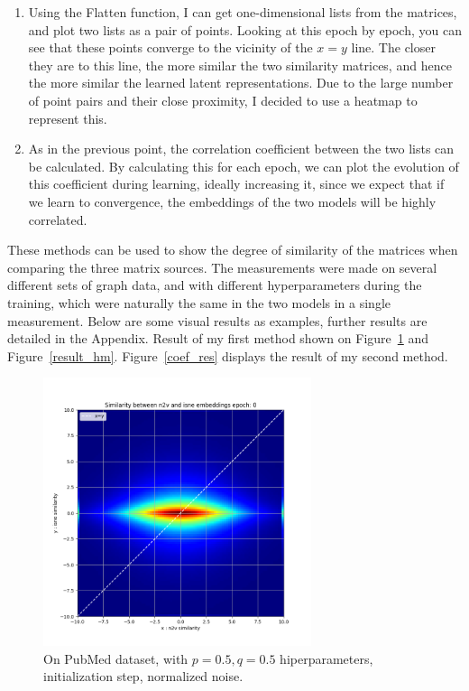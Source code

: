 \begin{enumerate}
    \item Using the Flatten function, I can get one-dimensional lists from the matrices, and plot two lists as a pair of points. Looking at this epoch by epoch, you can see that these points converge to the vicinity of the ${x=y}$ line. The closer they are to this line, the more similar the two similarity matrices, and hence the more similar the learned latent representations. Due to the large number of point pairs and their close proximity, I decided to use a heatmap to represent this.

    \item As in the previous point, the correlation coefficient between the two lists can be calculated. By calculating this for each epoch, we can plot the evolution of this coefficient during learning, ideally increasing it, since we expect that if we learn to convergence, the embeddings of the two models will be highly correlated.
\end{enumerate}

These methods can be used to show the degree of similarity of the matrices when comparing the three matrix sources. The measurements were made on several different sets of graph data, and with different hyperparameters during the training, which were naturally the same in the two models in a single measurement. Below are some visual results as examples, further results are detailed in the Appendix. Result of my first method shown on Figure~\ref{start_hm} and Figure~\ref{result_hm}. Figure~\ref{coef_res} displays the result of my second  method.

\begin{figure}[ht!]
	\centering
	\includegraphics[width=0.70\textwidth]{figures/start_hm.png}
	\caption{On PubMed dataset, with ${p = 0.5, q =0.5}$ hiperparameters, initialization step, normalized noise.}
	\label{start_hm}
\end{figure}

